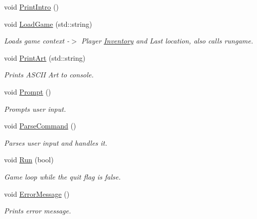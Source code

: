 \begin{DoxyCompactItemize}
void \mbox{\hyperlink{class_console_a65bd0080776d774e0328fbcc0e2654aa}{Print\+Intro}} ()
\item 
void \mbox{\hyperlink{class_console_a447d63350e9305664733258b0c8b91af}{Load\+Game}} (std\+::string)
\begin{DoxyCompactList}\small\item\em Loads game context -\/$>$ Player \mbox{\hyperlink{class_inventory}{Inventory}} and Last location, also calls rungame. \end{DoxyCompactList}\item 
void \mbox{\hyperlink{class_console_abec5429ffd3b6f4b6b9e575617941534}{Print\+Art}} (std\+::string)
\begin{DoxyCompactList}\small\item\em Prints A\+S\+C\+II Art to console. \end{DoxyCompactList}\item 
void \mbox{\hyperlink{class_console_aaf180b385dbda3c9d0e7edc19b72df72}{Prompt}} ()
\begin{DoxyCompactList}\small\item\em Prompts user input. \end{DoxyCompactList}\item 
void \mbox{\hyperlink{class_console_a543814c39f275f3faf0f2f44141ccd21}{Parse\+Command}} ()
\begin{DoxyCompactList}\small\item\em Parses user input and handles it. \end{DoxyCompactList}\item 
void \mbox{\hyperlink{class_console_a82b5310199041c8cb8c1a8b56e8f8754}{Run}} (bool)
\begin{DoxyCompactList}\small\item\em Game loop while the quit flag is false. \end{DoxyCompactList}\item 
void \mbox{\hyperlink{class_console_a86dd44bc90f6f17270a54fb8859d63c4}{Error\+Message}} ()
\begin{DoxyCompactList}\small\item\em Prints error message. \end{DoxyCompactList}\end{DoxyCompactItemize}
